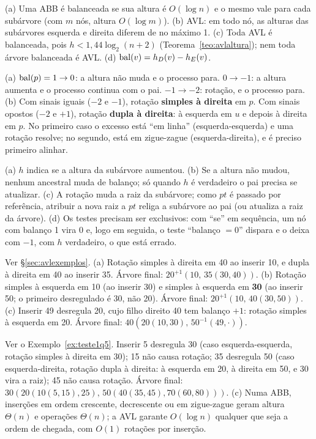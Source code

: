  (a) Uma ABB é balanceada se sua altura é $O(\log n)$ e o mesmo vale para cada subárvore (com $m$ nós, altura $O(\log m)$). (b) AVL: em todo nó, as alturas das subárvores esquerda e direita diferem de no máximo 1. (c) Toda AVL é balanceada, pois $h<1{,}44\log_2(n+2)$ (Teorema~\ref{teo:avlaltura}); nem toda árvore balanceada é AVL. (d) $\operatorname{bal}(v)=h_D(v)-h_E(v)$.

 (a) $\operatorname{bal}(p)=1\to0$: a altura não muda e o processo para. $0\to-1$: a altura aumenta e o processo continua com o pai. $-1\to-2$: rotação, e o processo para. (b) Com sinais iguais ($-2$ e $-1$), rotação \textbf{simples à direita} em $p$. Com sinais opostos ($-2$ e $+1$), rotação \textbf{dupla à direita}: à esquerda em $u$ e depois à direita em $p$. No primeiro caso o excesso está ``em linha'' (esquerda-esquerda) e uma rotação resolve; no segundo, está em zigue-zague (esquerda-direita), e é preciso primeiro alinhar.

 (a) $h$ indica se a altura da subárvore aumentou. (b) Se a altura não mudou, nenhum ancestral muda de balanço; só quando $h$ é verdadeiro o pai precisa se atualizar. (c) A rotação muda a raiz da subárvore; como $pt$ é passado por referência, atribuir a nova raiz a $pt$ religa a subárvore ao pai (ou atualiza a raiz da árvore). (d) Os testes precisam ser exclusivos: com ``se'' em sequência, um nó com balanço 1 vira 0 e, logo em seguida, o teste ``balanço $=0$'' dispara e o deixa com $-1$, com $h$ verdadeiro, o que está errado.

 Ver §\ref{sec:avlexemplos}. (a) Rotação simples à direita em 40 ao inserir 10, e dupla à direita em 40 ao inserir 35. Árvore final: $20^{+1}(10,\,35(30,40))$. (b) Rotação simples à esquerda em 10 (ao inserir 30) e simples à esquerda em \textbf{30} (ao inserir 50; o primeiro desregulado é 30, não 20). Árvore final: $20^{+1}(10,\,40(30,50))$. (c) Inserir 49 desregula 20, cujo filho direito 40 tem balanço $+1$: rotação simples à esquerda em 20. Árvore final: $40(20(10,30),\,50^{-1}(49,\cdot))$.

 Ver o Exemplo~\ref{ex:teste1q5}. Inserir 5 desregula 30 (caso esquerda-esquerda, rotação simples à direita em 30); 15 não causa rotação; 35 desregula 50 (caso esquerda-direita, rotação dupla à direita: à esquerda em 20, à direita em 50, e 30 vira a raiz); 45 não causa rotação. Árvore final: $30(20(10(5,15),25),\allowbreak\,50(40(35,45),70(60,80)))$. (c) Numa ABB, inserções em ordem crescente, decrescente ou em zigue-zague geram altura $\Theta(n)$ e operações $\Theta(n)$; a AVL garante $O(\log n)$ qualquer que seja a ordem de chegada, com $O(1)$ rotações por inserção.

